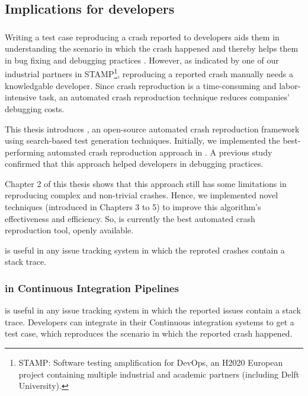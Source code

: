 \subsection{Implications for developers}

\subsubsection{\botsing}

Writing a test case reproducing a crash reported to developers aids them in understanding the scenario in which the crash happened and thereby helps them in bug fixing and debugging practices \cite{Zeller2009}. However, as indicated by one of our industrial partners in STAMP\footnote{STAMP: Software testing amplification for DevOps, an H2020 European project containing multiple industrial and academic partners (including Delft University).}, reproducing a reported crash manually needs a knowledgable developer. Since crash reproduction is a time-consuming and labor-intensive task, an automated crash reproduction technique reduces companies' debugging costs.

This thesis introduces \botsing, an open-source automated crash reproduction framework using search-based test generation techniques. 
Initially, we implemented the best-performing automated crash reproduction approach \cite{Soltani2018a} in \botsing. A previous study confirmed that this approach helped developers in debugging practices.

Chapter 2 of this thesis shows that this approach still has some limitations in reproducing complex and non-trivial crashes. Hence, we implemented novel techniques (introduced in Chapters 3 to 5) to improve this algorithm's effectiveness and efficiency. So, \botsing is currently the best automated crash reproduction tool, openly available.


\botsing is useful in any issue tracking system in which the reproted crashes contain a stack trace.


\subsubsection{\botsing in Continuous Integration Pipelines}
\botsing is useful in any issue tracking system in which the reported issues contain a stack trace. Developers can integrate \botsing in their Continuous integration systems to get a test case, which reproduces the scenario in which the reported crash happened.

